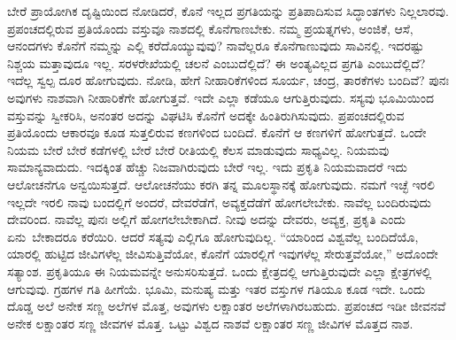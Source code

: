 ಬೇರೆ ಪ್ರಾಯೋಗಿಕ ದೃಷ್ಟಿಯಿಂದ ನೋಡಿದರೆ, ಕೊನೆ ಇಲ್ಲದ ಪ್ರಗತಿಯನ್ನು ಪ್ರತಿಪಾದಿಸುವ ಸಿದ್ಧಾಂತಗಳು ನಿಲ್ಲಲಾರವು. ಪ್ರಪಂಚದಲ್ಲಿರುವ ಪ್ರತಿಯೊಂದು ವಸ್ತುವೂ ನಾಶದಲ್ಲಿ ಕೊನೆಗಾಣಬೇಕು. ನಮ್ಮ ಪ್ರಯತ್ನಗಳು, ಅಂಜಿಕೆ, ಆಸೆ, ಆನಂದಗಳು ಕೊನೆಗೆ ನಮ್ಮನ್ನು ಎಲ್ಲಿ ಕರೆದೊಯ್ಯುವುವು? ನಾವೆಲ್ಲರೂ ಕೊನೆಗಾಣುವುದು ಸಾವಿನಲ್ಲಿ. ಇದರಷ್ಟು ನಿಶ್ಚಯ ಮತ್ತಾವುದೂ ಇಲ್ಲ. ಸರಳರೇಖೆಯಲ್ಲಿ ಚಲನೆ ಎಂಬುದೆಲ್ಲಿದೆ? ಈ ಅಂತ್ಯವಿಲ್ಲದ ಪ್ರಗತಿ ಎಂಬುದೆಲ್ಲಿದೆ? ಇದೆಲ್ಲ ಸ್ವಲ್ಪ ದೂರ ಹೋಗುವುದು. ನೋಡಿ, ಹೇಗೆ ನೀಹಾರಿಕೆಗಳಿಂದ ಸೂರ್ಯ, ಚಂದ್ರ, ತಾರಕೆಗಳು ಬಂದಿವೆ? ಪುನಃ ಅವುಗಳು ನಾಶವಾಗಿ ನೀಹಾರಿಕೆಗೇ ಹೋಗುತ್ತವೆ. ಇದೇ ಎಲ್ಲಾ ಕಡೆಯೂ ಆಗುತ್ತಿರುವುದು. ಸಸ್ಯವು ಭೂಮಿಯಿಂದ ವಸ್ತುವನ್ನು ಸ್ವೀಕರಿಸಿ, ಅನಂತರ ಅದನ್ನು ವಿಘಟಿಸಿ ಕೊನೆಗೆ ಅದಕ್ಕೇ ಹಿಂತಿರುಗಿಸುವುದು. ಪ್ರಪಂಚದಲ್ಲಿರುವ ಪ್ರತಿಯೊಂದು ಆಕಾರವೂ ಕೂಡ ಸುತ್ತಲಿರುವ ಕಣಗಳಿಂದ ಬಂದಿದೆ. ಕೊನೆಗೆ ಆ ಕಣಗಳಿಗೆ ಹೋಗುತ್ತದೆ. ಒಂದೇ ನಿಯಮ ಬೇರೆ ಬೇರೆ ಕಡೆಗಳಲ್ಲಿ ಬೇರೆ ಬೇರೆ ರೀತಿಯಲ್ಲಿ ಕೆಲಸ ಮಾಡುವುದು ಸಾಧ್ಯವಿಲ್ಲ. ನಿಯಮವು ಸಾಮಾನ್ಯವಾದುದು. ಇದಕ್ಕಿಂತ ಹೆಚ್ಚು ನಿಜವಾಗಿರುವುದು ಬೇರೆ ಇಲ್ಲ. ಇದು ಪ್ರಕೃತಿ ನಿಯಮವಾದರೆ ಇದು ಆಲೋಚನೆಗೂ ಅನ್ವಯಿಸುತ್ತದೆ. ಆಲೋಚನೆಯು ಕರಗಿ ತನ್ನ ಮೂಲಸ್ಥಾನಕ್ಕೆ ಹೋಗುವುದು. ನಮಗೆ ಇಚ್ಛೆ ಇರಲಿ ಇಲ್ಲದೇ ಇರಲಿ ನಾವು ಬಂದಲ್ಲಿಗೆ ಅಂದರೆ, ದೇವರೆಡೆಗೆ, ಅವ್ಯಕ್ತದೆಡೆಗೆ ಹೋಗಲೇಬೇಕು. ನಾವೆಲ್ಲ ಬಂದಿರುವುದು ದೇವರಿಂದ. ನಾವೆಲ್ಲ ಪುನಃ ಅಲ್ಲಿಗೆ ಹೋಗಲೇಬೇಕಾಗಿದೆ. ನೀವು ಅದನ್ನು ದೇವರು, ಅವ್ಯಕ್ತ, ಪ್ರಕೃತಿ ಎಂದು ಏನು\break\ ಬೇಕಾದರೂ ಕರೆಯಿರಿ. ಆದರೆ ಸತ್ಯವು ಎಲ್ಲಿಗೂ ಹೋಗುವುದಿಲ್ಲ. “ಯಾರಿಂದ ವಿಶ್ವವೆಲ್ಲ ಬಂದಿದೆಯೊ, ಯಾರಲ್ಲಿ ಹುಟ್ಟಿದ ಜೀವಿಗಳೆಲ್ಲ ಜೀವಿಸುತ್ತಿವೆಯೋ, ಕೊನೆಗೆ ಯಾರಲ್ಲಿಗೆ ಇವುಗಳೆಲ್ಲ ಸೇರುತ್ತವೆಯೋ,” ಅದೊಂದೇ ಸತ್ಯಾಂಶ. ಪ್ರಕೃತಿಯೂ ಈ ನಿಯಮವನ್ನೇ ಅನುಸರಿಸುತ್ತದೆ. ಒಂದು ಕ್ಷೇತ್ರದಲ್ಲಿ ಆಗುತ್ತಿರುವುದೇ ಎಲ್ಲಾ ಕ್ಷೇತ್ರಗಳಲ್ಲಿ ಆಗುವುವು. ಗ್ರಹಗಳ ಗತಿ ಹೀಗೆಯೆ. ಭೂಮಿ, ಮನುಷ್ಯ ಮತ್ತು ಇತರ ವಸ್ತುಗಳ ಗತಿಯೂ ಕೂಡ ಇದೇ. ಒಂದು ದೊಡ್ಡ ಅಲೆ ಅನೇಕ ಸಣ್ಣ ಅಲೆಗಳ ಮೊತ್ತ, ಅವುಗಳು ಲಕ್ಷಾಂತರ ಅಲೆಗಳಾಗಿರಬಹುದು. ಪ್ರಪಂಚದ ಇಡೀ ಜೀವನವೆ ಅನೇಕ ಲಕ್ಷಾಂತರ ಸಣ್ಣ ಜೀವಗಳ ಮೊತ್ತ. ಒಟ್ಟು ವಿಶ್ವದ ನಾಶವೆ ಲಕ್ಷಾಂತರ ಸಣ್ಣ ಜೀವಿಗಳ ಮೊತ್ತದ ನಾಶ. 

\vskip 0.3cm

